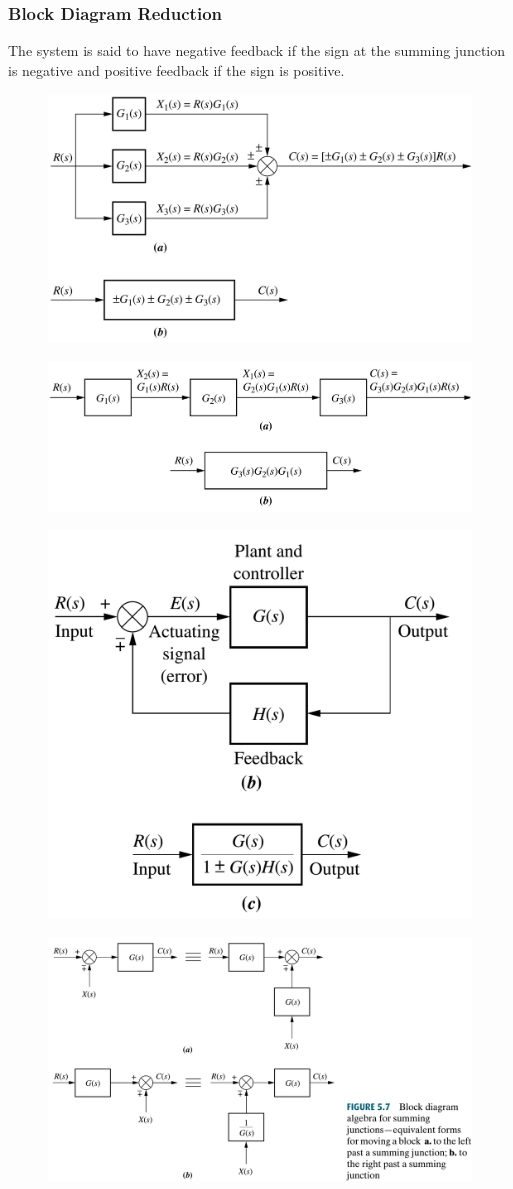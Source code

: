 \documentclass{beamer}
\begin{document}
\begin{frame}[allowframebreaks]
\frametitle{Block Diagram Reduction}
The system is said to have negative feedback if the sign at the summing junction is negative and positive
feedback if the sign is positive.
\begin{figure}
	\centering
	\includegraphics[width=0.7\linewidth]{Figures/Ch2/ParallelSystems}
	\caption{}
	\label{fig:parallelsystems}
\end{figure}
\begin{figure}
	\centering
	\includegraphics[width=0.7\linewidth]{Figures/Ch2/CascadingSystems}
	\caption{}
	\label{fig:cascadingsystems}
\end{figure}
\begin{figure}
	\centering
	\includegraphics[width=0.5\linewidth]{Figures/Ch2/FeedbackForm}
	\caption{}
	\label{fig:feedbackform}
\end{figure}
\begin{figure}
	\centering
	\includegraphics[width=0.7\linewidth]{Figures/Ch2/MovingBlocks1}
	\caption{}
	\label{fig:movingblocks1}
\end{figure}
\end{frame}
\end{document}
